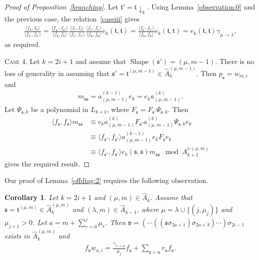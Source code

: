 \documentclass[11pt,a4paper,reqno,svgnames]{amsart}
\theoremstyle{plain}
\newtheorem{corollary}[theorem]{Corollary}
\theoremstyle{definition}
\numberwithin{equation}{section}
\begin{document}
\begin{proof}[Proof of Proposition~\ref{branching}]
Let $\mathfrak{t}'=\mathfrak{t}\downarrow_{k}$. Using Lemma~\ref{observation:0} and the previous case, the relation~\eqref{caseiii} gives 
\begin{align*}
\frac{\langle f_\mathfrak{s},f_\mathfrak{s}\rangle}{\langle f_\mathfrak{s'},f_\mathfrak{s'}\rangle}
= \frac{\langle f_\mathfrak{s'},f_\mathfrak{s'}\rangle}{\langle f_\mathfrak{s},f_\mathfrak{s}\rangle}
\frac{\langle f_\mathfrak{t},f_\mathfrak{t}\rangle}{\langle f_\mathfrak{t'},f_\mathfrak{t'}\rangle} \frac{\langle f_\mathfrak{t'},f_\mathfrak{t'}\rangle}{\langle f_\mathfrak{v},f_\mathfrak{v}\rangle}e_k(\mathfrak{t,t})=\frac{\langle f_\mathfrak{t'},f_\mathfrak{t'}\rangle}{\langle f_\mathfrak{v},f_\mathfrak{v}\rangle}e_k(\mathfrak{t,t})= e_k(\mathfrak{t,t})\gamma_{\mu\to\lambda},
\end{align*}
as required.

{\textsc{Case 4.}} Let $k=2i+1$ and assume that $\operatorname{Shape}(\mathfrak{s'})=(\mu,m-1)$. There is no loss of generality in assuming that $\mathfrak{s'}=\mathfrak{t}^{(\mu,m-1)}\in\hat{A}_k^{(\mu,m-1)}$. Then $p_\mathfrak{s}=w_{m,i}$ and 
\begin{align*}
m_\mathfrak{ss}=a_{(\mu,m-1)}^{(k-1)}e_k=e_k a_{(\mu,m-1)}^{(k)}. 
\end{align*}
Let $\Psi_{\mathfrak{s},k}$ be a polynomial in $L_{k+1}$, where $F_\mathfrak{s}=F_\mathfrak{s'}\Psi_{\mathfrak{s},k}$. Then 
\begin{align*}
\langle f_\mathfrak{s},f_\mathfrak{s}\rangle m_\mathfrak{ss} &\equiv e_k a_{(\mu,m-1)}^{(k)} F_\mathfrak{s'} a_{(\mu,m-1)}^{(k)}\Psi_{\mathfrak{s},k}e_k \\
&\equiv \langle f_\mathfrak{s'},f_\mathfrak{s'}\rangle a_{(\mu,m-1)}^{(k-1)} e_kF_\mathfrak{s}e_k \\
&\equiv \langle f_\mathfrak{s'},f_\mathfrak{s'}\rangle e_k(\mathfrak{s,s})m_\mathfrak{ss} \mod A_{k+1}^{\rhd(\mu,m)}
\end{align*}
gives the required result.
\end{proof}
Our proof of Lemma~\ref{offdiag:2} requires the following observation.
\begin{corollary}\label{obs:7}
Let $k=2i+1$ and  $(\mu,m)\in\hat{A}_{k}$. Assume that $\mathfrak{s}=\mathfrak{t}^{(\mu,m)}\in\hat{A}_{k}^{(\mu,m)}$ and $(\lambda,m)\in\hat{A}_{k-1}$, where $\mu=\lambda\cup\lbrace(j,\mu_j)\rbrace$ and $\mu_{j+1}>0$. Let $a=m+\sum_{r=0}^j\mu_r$. Then $\mathfrak{v}=(\cdots ((\mathfrak{s}\sigma_{2a+1})\sigma_{2a+3})\cdots)\sigma_{2i-1}$ exists in $\hat{A}_{k}^{(\mu,m)}$ and 
\begin{align*}
f_\mathfrak{v}w_{a,i}=\frac{\gamma_{\lambda\to\mu}}{\mu_j}f_\mathfrak{s}+\sum_{\mathfrak{s}\succ\mathfrak{u}}r_\mathfrak{u}f_\mathfrak{u}.
\end{align*}
\end{corollary}
\end{document}
